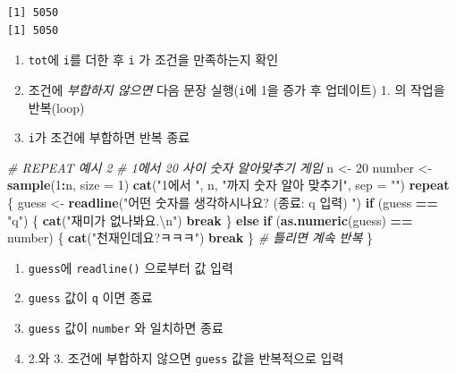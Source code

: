 \documentclass[
  11pt,
]{krantz}
\makeatletter
\newenvironment{Shaded}{\begin{snugshade}}{\end{snugshade}}
\newcommand{\CharTok}[1]{\textcolor[rgb]{0.5,0.5,0.5}{#1}}
\newcommand{\CommentTok}[1]{\textcolor[rgb]{0.37,0.37,0.37}{\textit{#1}}}
\newcommand{\ControlFlowTok}[1]{\textcolor[rgb]{0.27,0.27,0.27}{\textbf{#1}}}
\newcommand{\DataTypeTok}[1]{\textcolor[rgb]{0.27,0.27,0.27}{#1}}
\newcommand{\DecValTok}[1]{\textcolor[rgb]{0.06,0.06,0.06}{#1}}
\newcommand{\KeywordTok}[1]{\textcolor[rgb]{0.27,0.27,0.27}{\textbf{#1}}}
\newcommand{\NormalTok}[1]{#1}
\newcommand{\OperatorTok}[1]{\textcolor[rgb]{0.43,0.43,0.43}{\textbf{#1}}}
\newcommand{\StringTok}[1]{\textcolor[rgb]{0.5,0.5,0.5}{#1}}
\providecommand{\tightlist}{%
  \setlength{\itemsep}{0pt}\setlength{\parskip}{0pt}}
\newenvironment{kframe}{%
\medskip{}
\setlength{\fboxsep}{.8em}
 \def\at@end@of@kframe{}%
 \ifinner\ifhmode%
  \def\at@end@of@kframe{\end{minipage}}%
  \begin{minipage}{\columnwidth}%
 \fi\fi%
 \def\FrameCommand##1{\hskip\@totalleftmargin \hskip-\fboxsep
 \colorbox{shadecolor}{##1}\hskip-\fboxsep
     \hskip-\linewidth \hskip-\@totalleftmargin \hskip\columnwidth}%
 \MakeFramed {\advance\hsize-\width
   \@totalleftmargin\z@ \linewidth\hsize
   \@setminipage}}%
 {\par\unskip\endMakeFramed%
 \at@end@of@kframe}
\renewenvironment{quote}{\begin{kframe}}{\end{kframe}}
\makeatother
\begin{document}
\begin{verbatim}
[1] 5050
[1] 5050
\end{verbatim}

\normalsize

\begin{quote}
\begin{enumerate}
\def\labelenumi{\arabic{enumi}.}
\tightlist
\item
  \texttt{tot}에 \texttt{i}를 더한 후 \texttt{i} 가 조건을 만족하는지 확인
\item
  조건에 \emph{부합하지 않으면} 다음 문장 실행(\texttt{i}에 1을 증가 후 업데이트) 1. 의 작업을 반복(loop)
\item
  \texttt{i}가 조건에 부합하면 반복 종료
\end{enumerate}
\end{quote}

\footnotesize

\begin{Shaded}
\begin{Highlighting}[]
\CommentTok{# REPEAT 예시 2}
\CommentTok{# 1에서 20 사이 숫자 알아맞추기 게임}
\NormalTok{n <-}\StringTok{ }\DecValTok{20}
\NormalTok{number <-}\StringTok{ }\KeywordTok{sample}\NormalTok{(}\DecValTok{1}\OperatorTok{:}\NormalTok{n, }\DataTypeTok{size =} \DecValTok{1}\NormalTok{)}
\KeywordTok{cat}\NormalTok{(}\StringTok{"1에서 "}\NormalTok{, n, }\StringTok{"까지 숫자 알아 맞추기"}\NormalTok{, }\DataTypeTok{sep =} \StringTok{""}\NormalTok{)}
\ControlFlowTok{repeat}\NormalTok{ \{}
\NormalTok{  guess <-}\StringTok{ }\KeywordTok{readline}\NormalTok{(}\StringTok{"어떤 숫자를 생각하시나요? (종료: q 입력) "}\NormalTok{)}
  \ControlFlowTok{if}\NormalTok{ (guess }\OperatorTok{==}\StringTok{ "q"}\NormalTok{) \{}
    \KeywordTok{cat}\NormalTok{(}\StringTok{"재미가 없나봐요.}\CharTok{\textbackslash{}n}\StringTok{"}\NormalTok{)}
    \ControlFlowTok{break}
\NormalTok{  \} }\ControlFlowTok{else} \ControlFlowTok{if}\NormalTok{ (}\KeywordTok{as.numeric}\NormalTok{(guess) }\OperatorTok{==}\StringTok{ }\NormalTok{number) \{}
    \KeywordTok{cat}\NormalTok{(}\StringTok{"천재인데요?ㅋㅋㅋ"}\NormalTok{)}
    \ControlFlowTok{break}
\NormalTok{  \}}
  \CommentTok{# 틀리면 계속 반복}
\NormalTok{\}}
\end{Highlighting}
\end{Shaded}

\normalsize

\begin{quote}
\begin{enumerate}
\def\labelenumi{\arabic{enumi}.}
\tightlist
\item
  \texttt{guess}에 \texttt{readline()} 으로부터 값 입력
\item
  \texttt{guess} 값이 \texttt{q} 이면 종료
\item
  \texttt{guess} 값이 \texttt{number} 와 일치하면 종료
\item
  2.와 3. 조건에 부합하지 않으면 \texttt{guess} 값을 반복적으로 입력
\end{enumerate}
\end{quote}
\end{document}
